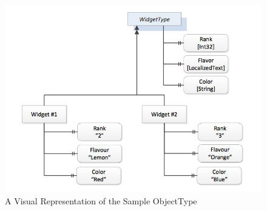 \begin{figure}[h]
  \centering
  \includegraphics[width=1.0\textwidth]{diagrams/SampleObjectType.png}
  \caption{A Visual Representation of the Sample ObjectType}
  \label{fig:sample_object_type}
\end{figure}

\FloatBarrier


